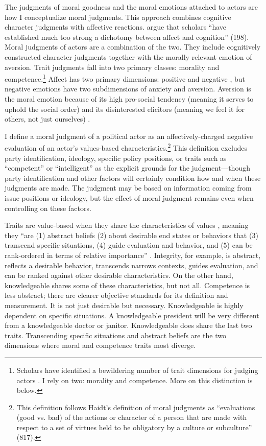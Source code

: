 The judgments of moral goodness and the moral emotions attached to actors are how I conceptualize moral judgments. This approach combines cognitive character judgments with affective reactions.  argue that scholars ``have established much too strong a dichotomy between affect and cognition'' (198). Moral judgments of actors are a combination of the two. They include cognitively constructed character judgments together with the morally relevant emotion of aversion. Trait judgments fall into two primary classes: morality and competence.\footnote{Scholars have identified a bewildering number of trait dimensions for judging actors \cite{BenoitMcHale2004,Funk1996b}. I rely on two: morality and competence. More on this distinction is below.} Affect has two primary dimensions: positive and negative \cite{HuddyFeldmanCassese2007,Marcusetal2000}, but negative emotions have two subdimensions of anxiety and aversion. Aversion is the moral emotion because of its high pro-social tendency (meaning it serves to uphold the social order) and its disinterested elicitors (meaning we feel it for others, not just ourselves) \cite{Haidt2003,Petersen2010,SteenbergenEllis2006}.

I define a moral judgment of a political actor as an affectively-charged negative evaluation of an actor's values-based characteristics.\footnote{This definition follows Haidt's \citeyear{Haidt2001} definition of moral judgments as ``evaluations (good vs. bad) of the actions or character of a person that are made with respect to a set of virtues held to be obligatory by a culture or subculture'' (817).} This definition excludes party identification, ideology, specific policy positions, or traits such as ``competent'' or ``intelligent'' as the explicit grounds for the judgment---though party identification and other factors will certainly condition how and when these judgments are made. The judgment may be based on information coming from issue positions or ideology, but the effect of moral judgment remains even when controlling on these factors.

Traits are value-based when they share the characteristics of values \cite[20]{Schwartz1994}, meaning they ``are (1) abstract beliefs (2) about desirable end states or behaviors that (3) transcend specific situations, (4) guide evaluation and behavior, and (5) can be rank-ordered in terms of relative importance'' \cite[882]{Goren2005}. Integrity, for example, is abstract, reflects a desirable behavior, transcends narrows contexts, guides evaluation, and can be ranked against other desirable characteristics. On the other hand, knowledgeable shares some of these characteristics, but not all. Competence is less abstract; there are clearer objective standards for its definition and measurement. It is not just desirable but necessary. Knowledgeable is highly dependent on specific situations. A knowledgeable president will be very different from a knowledgeable doctor or janitor. Knowledgeable does share the last two traits. Transcending specific situations and abstract beliefs are the two dimensions where moral and competence traits most diverge.

